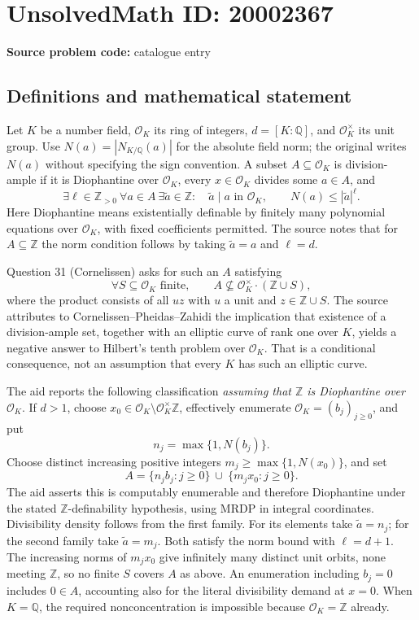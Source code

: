 \documentclass[11pt]{article}
\newcommand{\Z}{\mathbb{Z}}
\newcommand{\Q}{\mathbb{Q}}
\begin{document}
\section*{UnsolvedMath ID: 20002367}
\textbf{Source problem code:} catalogue entry
\subsection{Definitions and mathematical statement}
Let $K$ be a number field, $\mathcal O_K$ its ring of integers, $d=[K:\Q]$, and $\mathcal O_K^\times$ its unit group. Use $N(a)=|N_{K/\Q}(a)|$ for the absolute field norm; the original writes $N(a)$ without specifying the sign convention. A subset $A\subseteq\mathcal O_K$ is division-ample if it is Diophantine over $\mathcal O_K$, every $x\in\mathcal O_K$ divides some $a\in A$, and
\[
\exists\ell\in\Z_{>0}\ \forall a\in A\ \exists\widetilde a\in\Z:
\quad \widetilde a\mid a\text{ in }\mathcal O_K,\qquad N(a)\leq|\widetilde a|^\ell.
\]
Here Diophantine means existentially definable by finitely many polynomial equations over $\mathcal O_K$, with fixed coefficients permitted. The source notes that for $A\subseteq\Z$ the norm condition follows by taking $\widetilde a=a$ and $\ell=d$.

Question 31 (Cornelissen) asks for such an $A$ satisfying
\[
\forall S\subseteq\mathcal O_K\text{ finite},\qquad
A\not\subseteq\mathcal O_K^\times\cdot(\Z\cup S),
\]
where the product consists of all $u z$ with $u$ a unit and $z\in\Z\cup S$. The source attributes to Cornelissen--Pheidas--Zahidi the implication that existence of a division-ample set, together with an elliptic curve of rank one over $K$, yields a negative answer to Hilbert's tenth problem over $\mathcal O_K$. That is a conditional consequence, not an assumption that every $K$ has such an elliptic curve.

The aid reports the following classification \emph{assuming that $\Z$ is Diophantine over $\mathcal O_K$}. If $d>1$, choose $x_0\in\mathcal O_K\setminus\mathcal O_K^\times\Z$, effectively enumerate $\mathcal O_K=(b_j)_{j\geq0}$, and put
\[
n_j=\max\{1,N(b_j)\}.
\]
Choose distinct increasing positive integers $m_j\geq\max\{1,N(x_0)\}$, and set
\[
A=\{n_jb_j:j\geq0\}\ \cup\ \{m_jx_0:j\geq0\}.
\]
The aid asserts this is computably enumerable and therefore Diophantine under the stated $\Z$-definability hypothesis, using MRDP in integral coordinates. Divisibility density follows from the first family. For its elements take $\widetilde a=n_j$; for the second family take $\widetilde a=m_j$. Both satisfy the norm bound with $\ell=d+1$. The increasing norms of $m_jx_0$ give infinitely many distinct unit orbits, none meeting $\Z$, so no finite $S$ covers $A$ as above. An enumeration including $b_j=0$ includes $0\in A$, accounting also for the literal divisibility demand at $x=0$. When $K=\Q$, the required nonconcentration is impossible because $\mathcal O_K=\Z$ already.
\end{document}

